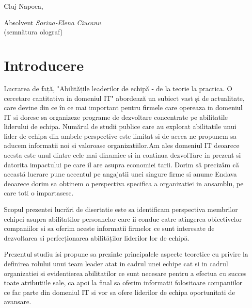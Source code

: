 \documentclass[a4paper, 12pt]{article}
\begin{document}
\vspace{3 cm}
\begin{flushleft}
	\large Cluj Napoca,
\end{flushleft}


\begin{flushright}
	\hfill \large Absolvent \textit{Sorina-Elena Ciucanu} \\
	\hfill \large {(semnătura olograf)}
\end{flushright}
\newpage
\thispagestyle{empty}
\tableofcontents
\thispagestyle{empty}
\newpage
\thispagestyle{empty}
\listoffigures
\newpage
\thispagestyle{empty}
\listoftables


\newpage



	\section*{Introducere}
	\quad\quad Lucrarea de față, "Abilitățile leaderilor de echipă - de la teorie la practica. O cercetare cantitativa  in domeniul IT" abordează un subiect vast și de actualitate, care devine din ce în ce mai important pentru firmele care opereaza in domeniul IT si doresc sa organizeze programe de dezvoltare concentrate pe abilitatile liderului de echipa. Numărul de studii publice care au explorat abilitatile unui lider de echipa din ambele perspective este limitat si de aceea ne propunem sa aducem informatii noi si valoroase organizatiilor.Am ales domeniul IT deoarece  acesta este unul dintre cele mai dinamice si in continua dezvolTare  in prezent si datorita impactului pe care il are asupra economiei tarii.  Dorim să precizăm că această lucrare pune accentul pe angajatii unei singure firme si anume Endava deoarece dorim sa obtinem o perspectiva specifica a organizatiei in ansamblu, pe care toti o impartasesc.

	\quad Scopul prezentei lucrări de disertatie este sa identificam perspectiva membrilor echipei asupra abilitatilor persoanelor care ii conduc catre atingerea obiectivelor companiilor si sa oferim aceste informatii firmelor ce sunt interesate de dezvoltarea si perfecționarea abilităților liderilor lor de echipă.

	\quad Prezentul studiu isi propune sa prezinte principalele aspecte teoretice cu privire la definirea rolului unui team leader atat in cadrul unei echipe cat si in cadrul organizatiei si evidentierea abilitatilor ce sunt necesare pentru a efectua cu succes toate atributiile sale, ca apoi la final sa oferim informatii folositoare companiilor ce fac parte din domeniul IT si vor sa ofere liderilor de echipa oportunitati de avansare.
\end{document}
